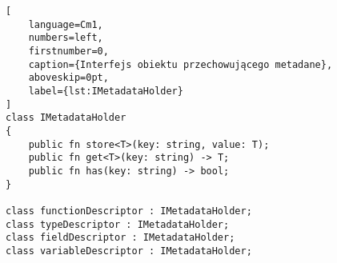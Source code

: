 \begin{lstlisting}[
    language=Cm1,
    numbers=left,
    firstnumber=0,
    caption={Interfejs obiektu przechowującego metadane},
    aboveskip=0pt,
    label={lst:IMetadataHolder}
]
class IMetadataHolder
{
    public fn store<T>(key: string, value: T);
    public fn get<T>(key: string) -> T;
    public fn has(key: string) -> bool;
}

class functionDescriptor : IMetadataHolder;
class typeDescriptor : IMetadataHolder;
class fieldDescriptor : IMetadataHolder;
class variableDescriptor : IMetadataHolder;
\end{lstlisting}